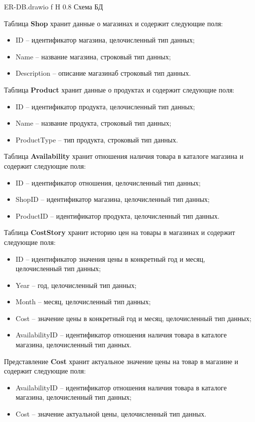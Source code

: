 \documentclass[a4paper]{bmstu}
\begin{document}
	{ER-DB.drawio}
	{f}
	{H}
	{0.8\textwidth}
	{Схема БД}

Таблица \textbf{Shop} хранит данные о магазинах и содержит следующие поля:
\begin{itemize}
	\item ID -- идентификатор магазина, целочисленный тип данных;
	\item Name -- название магазина, строковый тип данных;
	\item Description -- описание магазинаб строковый тип данных.
\end{itemize}


Таблица \textbf{Product} хранит данные о продуктах и содержит следующие поля:
\begin{itemize}
	\item ID -- идентификатор продукта, целочисленный тип данных;
	\item Name -- название продукта, строковый тип данных;
	\item ProductType -- тип продукта, строковый тип данных.
\end{itemize}


Таблица \textbf{Availability} хранит отношения наличия товара в каталоге магазина и содержит следующие поля:
\begin{itemize}
	\item ID -- идентификатор отношения, целочисленный тип данных;
	\item ShopID -- идентификатор магазина, целочисленный тип данных;
	\item ProductID -- идентификатор продукта, целочисленный тип данных.
\end{itemize}


Таблица \textbf{CostStory} хранит историю цен на товары в магазинах и содержит следующие поля:
\begin{itemize}
	\item ID -- идентификатор значения цены в конкретный год и месяц, целочисленный тип данных;
	\item Year -- год, целочисленный тип данных;
	\item Month -- месяц, целочисленный тип данных;
	\item Cost -- значение цены в конкретный год и месяц, целочисленный тип данных;
	\item AvailabilityID -- идентификатор отношения наличия товара в каталоге магазина, целочисленный тип данных.
\end{itemize}


Представление \textbf{Cost} хранит актуальное значение цены на товар в магазине и содержит следующие поля:
\begin{itemize}
	\item AvailabilityID -- идентификатор отношения наличия товара в каталоге магазина, целочисленный тип данных;
	\item Cost -- значение актуальной цены, целочисленный тип данных.
\end{itemize}
\end{document}
